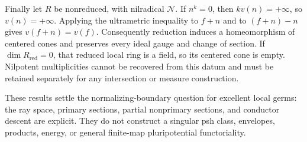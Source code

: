 Finally let $R$ be nonreduced, with nilradical $\mathcal N$.
If $n^k=0$, then $kv(n)=+\infty$, so $v(n)=+\infty$.
Applying the ultrametric inequality to $f+n$ and to $(f+n)-n$
gives $v(f+n)=v(f)$. Consequently reduction induces a homeomorphism
of centered cones and preserves every ideal gauge and change of section.
If $\dim R_{\mathrm{red}}=0$, that reduced local ring is a field,
so its centered cone is empty. Nilpotent multiplicities cannot be
recovered from this datum and must be retained separately for any
intersection or measure construction.

These results settle the normalizing-boundary question for excellent
local germs: the ray space, primary sections, partial nonprimary
sections, and conductor descent are explicit. They do not construct
a singular psh class, envelopes, products, energy, or general finite-map
pluripotential functoriality.
